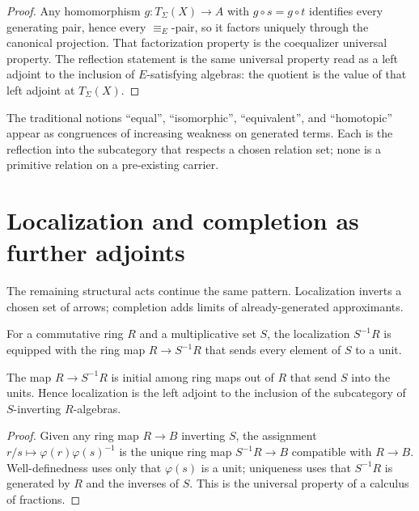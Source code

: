 \begin{proof}
Any homomorphism $g:T_\Sigma(X)\to A$ with $g\circ s=g\circ t$ identifies every
generating pair, hence every $\equiv_E$-pair, so it factors uniquely through the
canonical projection.  That factorization property is the coequalizer universal
property.  The reflection statement is the same universal property read as a
left adjoint to the inclusion of $E$-satisfying algebras: the quotient is the
value of that left adjoint at $T_\Sigma(X)$.
\end{proof}

\begin{principle}
\label{prin:ontology-kernel-equality-generated}
The traditional notions ``equal'', ``isomorphic'', ``equivalent'', and
``homotopic'' appear as congruences of increasing weakness on generated terms.
Each is the reflection into the subcategory that respects a chosen relation
set; none is a primitive relation on a pre-existing carrier.
\end{principle}

\section{Localization and completion as further adjoints}
\label{sec:ontology-kernel-localization-completion}

The remaining structural acts continue the same pattern.  Localization inverts
a chosen set of arrows; completion adds limits of already-generated approximants.

\begin{definition}
\label{def:ontology-kernel-localization-datum}
For a commutative ring $R$ and a multiplicative set $S$, the localization
$S^{-1}R$ is equipped with the ring map $R\to S^{-1}R$ that sends every element
of $S$ to a unit.
\end{definition}

\begin{theorem}
\label{thm:ontology-kernel-localization-universal}
The map $R\to S^{-1}R$ is initial among ring maps out of $R$ that send $S$ into
the units.  Hence localization is the left adjoint to the inclusion of the
subcategory of $S$-inverting $R$-algebras.
\end{theorem}

\begin{proof}
Given any ring map $R\to B$ inverting $S$, the assignment
$r/s\mapsto \varphi(r)\varphi(s)^{-1}$ is the unique ring map $S^{-1}R\to B$
compatible with $R\to B$.  Well-definedness uses only that $\varphi(s)$ is a
unit; uniqueness uses that $S^{-1}R$ is generated by $R$ and the inverses of
$S$.  This is the universal property of a calculus of fractions.
\end{proof}

